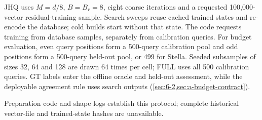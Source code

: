 JHQ uses $M=d/8$, $B=B_r=8$, eight coarse iterations and a requested
100,000-vector residual-training sample. Search sweeps reuse cached
trained states and re-encode the database; cold builds
start without that state. The code requests training from database samples,
separately from calibration queries. For budget evaluation, even query
positions form a 500-query calibration pool and odd positions form a
500-query held-out pool, or 499 for Stella. Seeded subsamples of sizes
32, 64 and 128 are drawn 64 times per cell; FULL uses all 500 calibration
queries. GT labels enter the offline oracle and held-out assessment, while
the deployable agreement rule uses search outputs
(\cref{sec:6-2,sec:a-budget-contract}).

Preparation code and shape logs establish this protocol; complete historical
vector-file and trained-state hashes are unavailable.
